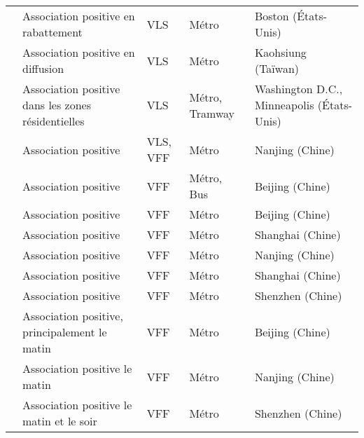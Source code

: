\begin{longtable}{p{3cm}p{3cm}p{1.5cm}p{1.8cm}p{3.3cm}}
    \small{\textcite{romm_differences_2022}}\index{Romm, Daniel|pagebf} & \small{Association positive en \gls{rabattement}} & \small{VLS} & \small{Métro} & \small{Boston (États-Unis)}\\ 
    \small{\textcite{cheng_expanding_2018}}\index{Cheng, Yung-Hsiang|pagebf} & \small{Association positive en \gls{diffusion}} & \small{VLS} & \small{Métro} & \small{Kaohsiung (Taïwan)}\\
    \small{\textcite{martin_evaluating_2014}}\index{Martin, Elliot W.|pagebf} & \small{Association positive dans les zones résidentielles} & \small{VLS} & \small{Métro, Tramway} & \small{Washington D.C., Minneapolis (États-Unis)}\\
    \small{\textcite{chen_what_2022}}\index{Chen, Wendong|pagebf} & \small{Association positive} & \small{VLS, VFF} & \small{Métro} & \small{Nanjing (Chine)}\\
    \small{\textcite{liu_mode_2022}}\index{Liu, Lumei|pagebf} & \small{Association positive} & \small{VFF} & \small{Métro, Bus} & \small{Beijing (Chine)}\\
    \small{\textcite{yu_understanding_2021}}\index{Yu, Senbin|pagebf} & \small{Association positive} & \small{VFF} & \small{Métro} & \small{Beijing (Chine)}\\
    \small{\textcite{lin_analysis_2019}}\index{Lin, Diao|pagebf} & \small{Association positive} & \small{VFF} & \small{Métro} & \small{Shanghai (Chine)}\\
    \small{\textcite{li_operating_2019}} & \small{Association positive} & \small{VFF} & \small{Métro} & \small{Nanjing (Chine)}\\
    \small{\textcite{li_exploring_2021}}\index{Li, Wei|pagebf} & \small{Association positive} & \small{VFF} & \small{Métro} & \small{Shanghai (Chine)}\\
    \small{\textcite{wang_relationship_2020}}\index{Wang, Ruoyu|pagebf} & \small{Association positive} & \small{VFF} & \small{Métro} & \small{Shenzhen (Chine)}\\
    \small{\textcite{liu_temporal_2022}}\index{Liu, Siyang|pagebf} & \small{Association positive, principalement le matin} & \small{VFF} & \small{Métro} & \small{Beijing (Chine)}\\
    \small{\textcite{cheng_exploring_2022}}\index{Cheng, Long|pagebf} & \small{Association positive le matin} & \small{VFF} & \small{Métro} & \small{Nanjing (Chine)}\\
    \small{\textcite{guo_dockless_2021}}\index{Guo, Yuanyuan|pagebf} & \small{Association positive le matin et le soir} & \small{VFF} & \small{Métro} & \small{Shenzhen (Chine)}\\

\end{longtable}
